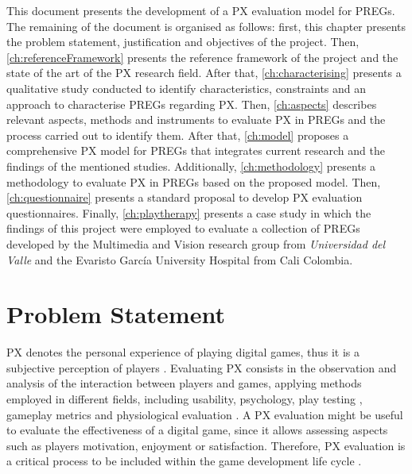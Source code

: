 This document presents the development of a \ac{PX} evaluation model for \acp{PREG}. The remaining of the document is organised as follows: first, this chapter presents the problem statement, justification and objectives of the project. Then, \autoref{ch:referenceFramework} presents the reference framework of the project and the state of the art of the \ac{PX} research field. After that, \autoref{ch:characterising} presents a qualitative study conducted to identify characteristics, constraints and an approach to characterise \acp{PREG} regarding \ac{PX}. Then, \autoref{ch:aspects} describes relevant aspects, methods and instruments to evaluate \ac{PX} in \acp{PREG} and the process carried out to identify them. After that, \autoref{ch:model} proposes a comprehensive \ac{PX} model for \acp{PREG} that integrates current research and the findings of the mentioned studies. Additionally, \autoref{ch:methodology} presents a methodology to evaluate \ac{PX} in \acp{PREG} based on the proposed model. Then, \autoref{ch:questionnaire} presents a standard proposal to develop \ac{PX} evaluation questionnaires. Finally, \autoref{ch:playtherapy} presents a case study in which the findings of this project were employed to evaluate a collection of \acp{PREG} developed by the Multimedia and Vision research group from \textit{Universidad del Valle} and the Evaristo Garc\'ia University Hospital from Cali Colombia.

\section{Problem Statement}


\ac{PX} denotes the personal experience of playing digital games, thus it is a subjective perception of players \autocite{Wiemeyer2016,Chu2011}. Evaluating \ac{PX} consists in the observation and analysis of the interaction between players and games, applying methods employed in different fields, including usability, psychology, play testing \autocite{Wiemeyer2016}, gameplay metrics \autocite{Drachen2013} and physiological evaluation \autocite{Nacke2015}. A \ac{PX} evaluation might be useful to evaluate the effectiveness of a digital game, since it allows assessing aspects such as players motivation, enjoyment or satisfaction. Therefore, \ac{PX} evaluation is a critical process to be included within the game development life cycle \autocite{Bernhaupt2015,McAllister2015,desurvire_methods_2013,Nacke2009}.

